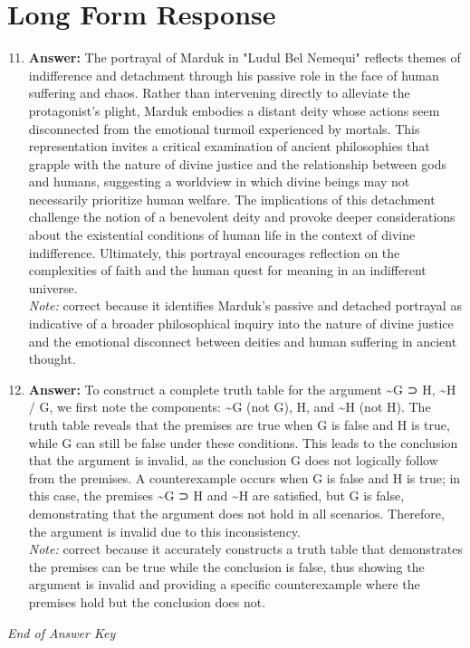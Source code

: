 \documentclass[12pt]{article}
\begin{document}
\section*{Long Form Response}
\begin{enumerate}[label=\arabic*.]
\setcounter{enumi}{10}
\item \textbf{Answer:} The portrayal of Marduk in "Ludul Bel Nemequi" reflects themes of indifference and detachment through his passive role in the face of human suffering and chaos. Rather than intervening directly to alleviate the protagonist's plight, Marduk embodies a distant deity whose actions seem disconnected from the emotional turmoil experienced by mortals. This representation invites a critical examination of ancient philosophies that grapple with the nature of divine justice and the relationship between gods and humans, suggesting a worldview in which divine beings may not necessarily prioritize human welfare. The implications of this detachment challenge the notion of a benevolent deity and provoke deeper considerations about the existential conditions of human life in the context of divine indifference. Ultimately, this portrayal encourages reflection on the complexities of faith and the human quest for meaning in an indifferent universe.
\\ \textit{Note:} correct because it identifies Marduk's passive and detached portrayal as indicative of a broader philosophical inquiry into the nature of divine justice and the emotional disconnect between deities and human suffering in ancient thought.
\item \textbf{Answer:} To construct a complete truth table for the argument \textasciitilde{}G ⊃ H, \textasciitilde{}H / G, we first note the components: \textasciitilde{}G (not G), H, and \textasciitilde{}H (not H). The truth table reveals that the premises are true when G is false and H is true, while G can still be false under these conditions. This leads to the conclusion that the argument is invalid, as the conclusion G does not logically follow from the premises. A counterexample occurs when G is false and H is true; in this case, the premises \textasciitilde{}G ⊃ H and \textasciitilde{}H are satisfied, but G is false, demonstrating that the argument does not hold in all scenarios. Therefore, the argument is invalid due to this inconsistency.
\\ \textit{Note:} correct because it accurately constructs a truth table that demonstrates the premises can be true while the conclusion is false, thus showing the argument is invalid and providing a specific counterexample where the premises hold but the conclusion does not.
\end{enumerate}

\vfill
\noindent\textit{End of Answer Key}
\end{document}
